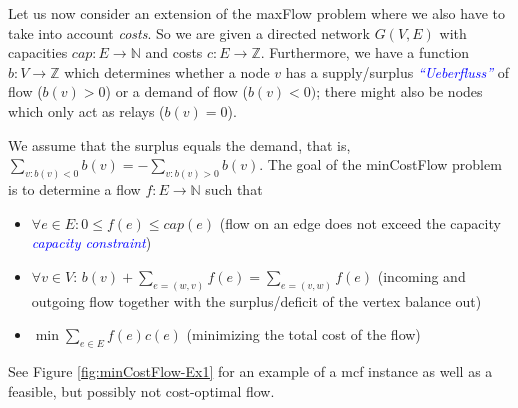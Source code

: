 \documentclass{article}
\begin{document}
Let us now consider an extension of the maxFlow problem where we also have to take into account \emph{costs}.
So we are given a directed network $G(V,E)$ with capacities $cap:E\rightarrow \mathbb{N}$ and costs $c:E\rightarrow \mathbb{Z}$. Furthermore, we have a function $b:V\rightarrow \mathbb{Z}$ which determines whether a node $v$ has a supply/surplus \textcolor{blue}{\emph{"`Ueberfluss"'}} of flow ($b(v)>0$) or a demand of flow ($b(v)<0)$; there might also be nodes which only act as relays ($b(v)=0$).

We assume that the surplus equals the demand, that is, $\displaystyle \sum_{v:b(v)<0} b(v)=-\sum_{v:b(v)>0} b(v)$.
The goal of the minCostFlow problem is to determine a flow $f:E\rightarrow \mathbb{N}$ such that
\begin{itemize}
\item $\forall e\in E: 0\leq f(e)\leq cap(e)$ (flow on an edge does not exceed the capacity \textcolor{blue}{\emph{capacity constraint}})
\item $\forall v\in V$: $\displaystyle b(v)+\sum_{e=(w,v)}f(e)=\sum_{e=(v,w)}f(e)$ (incoming and outgoing flow together with the surplus/deficit of the vertex balance out)
\item $\displaystyle\min \sum_{e\in E} f(e)c(e)$ (minimizing the total cost of the flow)
\end{itemize}

See Figure \ref{fig:minCostFlow-Ex1} for an example of a mcf instance as well as a feasible, but possibly not cost-optimal flow.
\end{document}
